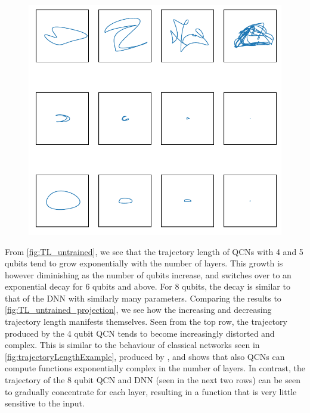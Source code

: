 \begin{figure}[H]
    \centering
    \includegraphics[width=12cm]{latex/figures/TL_untrained_projection.pdf}
    \caption{}
    \label{fig:TL_untrained_projection}
\end{figure}


From \autoref{fig:TL_untrained}, we see that the trajectory length of QCNs with 4 and 5 qubits tend to grow exponentially with the number of layers. This growth is however diminishing as the number of qubits increase, and switches over to an exponential decay for 6 qubits and above. For 8 qubits, the decay is similar to that of the DNN with similarly many parameters. Comparing the results to \autoref{fig:TL_untrained_projection}, we see how the increasing and decreasing trajectory length manifests themselves. Seen from the top row, the trajectory produced by the 4 qubit QCN tends to become increasingly distorted and complex. This is similar to the behaviour of classical networks seen in \autoref{fig:trajectoryLengthExample}, produced by \citet{raghu2017expressive}, and shows that also QCNs can compute functions exponentially complex in the number of layers. In contrast, the trajectory of the 8 qubit QCN and DNN (seen in the next two rows) can be seen to gradually concentrate for each layer, resulting in a function that is very little sensitive to the input.  


